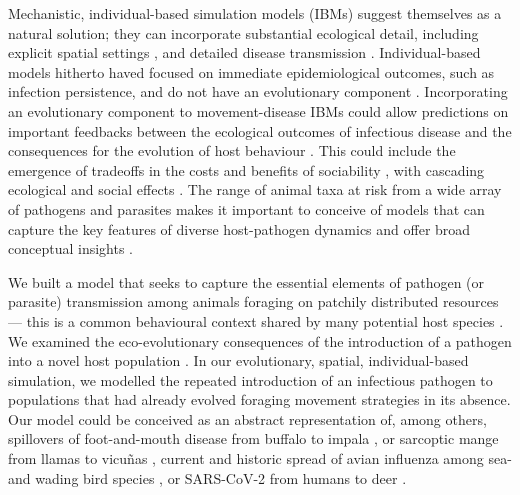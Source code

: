 Mechanistic, individual-based simulation models (IBMs) suggest themselves as a natural solution; they can incorporate substantial ecological detail, including explicit spatial settings \autocite{deangelis2019}, and detailed disease transmission \autocite{white2018, scherer2020,lunn2021,white2018a}.
Individual-based models hitherto haved focused on immediate epidemiological outcomes, such as infection persistence, and do not have an evolutionary component \autocite{white2018,scherer2020,lunn2021}.
Incorporating an evolutionary component to movement-disease IBMs could allow predictions on important feedbacks between the ecological outcomes of infectious disease and the consequences for the evolution of host behaviour \autocite{cantor2021}.
This could include the emergence of tradeoffs in the costs and benefits of sociability \autocite{gartland2021}, with cascading ecological and social effects \autocite{monk2022,spiegel2017,tanner2012,webber2022}.
The range of animal taxa at risk from a wide array of pathogens and parasites \autocite{carlson2022a,sanderson2020} makes it important to conceive of models that can capture the key features of diverse host-pathogen dynamics and offer broad conceptual insights \autocite{white2018a,white2018}.

We built a model that seeks to capture the essential elements of pathogen (or parasite) transmission among animals foraging on patchily distributed resources --- this is a common behavioural context shared by many potential host species \autocite{white2018a,white2018}.
We examined the eco-evolutionary consequences of the introduction of a pathogen into a novel host population \autocite[such as during cross-species spillover:][]{blehert2009,bastos2000,wille2022,fereidouni2019,scheele2019,sanderson2020,carlson2022a,kuchipudi2022,monk2022}.
In our evolutionary, spatial, individual-based simulation, we modelled the repeated introduction of an infectious pathogen to populations that had already evolved foraging movement strategies in its absence.
Our model could be conceived as an abstract representation of, among others, spillovers of foot-and-mouth disease from buffalo to impala \autocite{bastos2000,vosloo2009}, or sarcoptic mange from llamas to vicu\~nas \autocite{monk2022}, current and historic spread of avian influenza among sea- and wading bird species \autocite{globconsorth5n82016,wille2022}, or SARS-CoV-2 from humans to deer \autocite{chandler2021,kuchipudi2022}.

